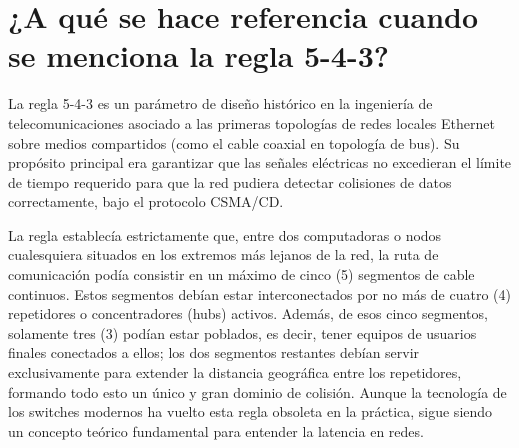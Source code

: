 \documentclass[a4paper,12pt]{article}
\begin{document}
\section{¿A qué se hace referencia cuando se menciona la regla 5-4-3?}

La regla 5-4-3 es un parámetro de diseño histórico en la ingeniería de telecomunicaciones asociado a las primeras topologías de redes locales Ethernet sobre medios compartidos (como el cable coaxial en topología de bus). Su propósito principal era garantizar que las señales eléctricas no excedieran el límite de tiempo requerido para que la red pudiera detectar colisiones de datos correctamente, bajo el protocolo CSMA/CD.

La regla establecía estrictamente que, entre dos computadoras o nodos cualesquiera situados en los extremos más lejanos de la red, la ruta de comunicación podía consistir en un máximo de cinco (5) segmentos de cable continuos. Estos segmentos debían estar interconectados por no más de cuatro (4) repetidores o concentradores (hubs) activos. Además, de esos cinco segmentos, solamente tres (3) podían estar poblados, es decir, tener equipos de usuarios finales conectados a ellos; los dos segmentos restantes debían servir exclusivamente para extender la distancia geográfica entre los repetidores, formando todo esto un único y gran dominio de colisión. Aunque la tecnología de los switches modernos ha vuelto esta regla obsoleta en la práctica, sigue siendo un concepto teórico fundamental para entender la latencia en redes.

\newpage
\end{document}
